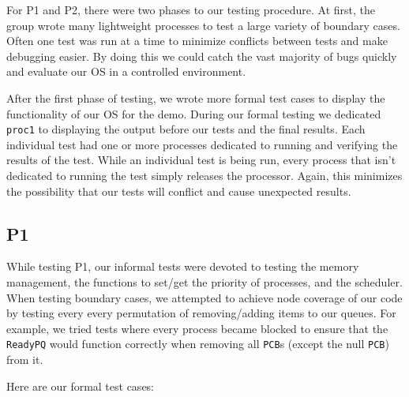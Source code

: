 \documentclass[12pt]{report}
\begin{document}
For P1 and P2, there were two phases to our testing procedure.  At first, the group wrote many lightweight processes to test a large variety of boundary cases.  Often one test was run at a time to minimize conflicts between tests and make debugging easier.  By doing this we could catch the vast majority of bugs quickly and evaluate our OS in a controlled environment.

After the first phase of testing, we wrote more formal test cases to display the functionality of our OS for the demo.  During our formal testing we dedicated \texttt{proc1} to displaying the output before our tests and the final results. Each individual test had one or more processes dedicated to running and verifying the results of the test.  While an individual test is being run, every process that isn't dedicated to running the test simply releases the processor.  Again, this minimizes the possibility that our tests will conflict and cause unexpected results.

\subsection{P1}

While testing P1, our informal tests were devoted to testing the memory management, the functions to set/get the priority of processes, and the scheduler.  When testing boundary cases, we attempted to achieve node coverage of our code by testing every every permutation of removing/adding items to our queues.  For example, we tried tests where every process became blocked to ensure that the \texttt{ReadyPQ} would function correctly when removing all \texttt{PCB}s (except the null \texttt{PCB}) from it.

Here are our formal test cases:
\end{document}
